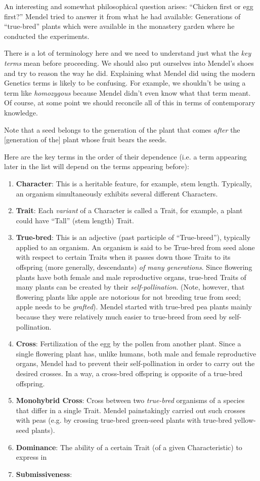 \documentclass[12pt]{article}
\begin{document}
An interesting and somewhat philosophical question arises: ``Chicken first or egg first?'' Mendel tried to answer it from what he had available: Generations of ``true-bred'' plants which were available in the monastery garden where he conducted the experiments. 

There is a lot of terminology here and we need to understand just what the \emph{key terms} mean before proceeding. We should also put ourselves into Mendel's shoes and try to reason the way he did. Explaining what Mendel did using the modern Genetics terms is likely to be confusing. For example, we shouldn't be using a term like \emph{homozygous} because Mendel didn't even know what that term meant. Of course, at some point we should reconcile all of this in terms of contemporary knowledge. 

Note that a seed belongs to the generation of the plant that comes \emph{after} the [generation of the] plant whose fruit bears the seeds.

Here are the key terms in the order of their dependence (i.e. a term appearing later in the list will depend on the terms appearing before):
\begin{enumerate}
    \item \textbf{Character}: This is a heritable feature, for example, stem length. Typically, an organism simultaneously exhibits several different Characters.
    \item \textbf{Trait}: Each \emph{variant} of a Character is called a Trait, for example, a plant could have ``Tall'' (stem length) Trait.
    \item \textbf{True-bred}: This is an adjective (past participle of ``True-breed''), typically applied to an organism. An organism is said to be True-bred from seed alone with respect to certain Traits when it passes down those Traits to its offspring (more generally, descendants) \emph{of many generations}. Since flowering plants have both female and male reproductive organs, true-bred Traits of many plants can be created by their \emph{self-pollination}. (Note, however, that flowering plants like apple are notorious for not breeding true from seed; apple needs to be \emph{grafted}). Mendel started with true-bred pea plants mainly because they were relatively much easier to true-breed from seed by self-pollination.
    \item \textbf{Cross}: Fertilization of the egg by the pollen from another plant. Since a single flowering plant has, unlike humans, both male and female reproductive organs, Mendel had to prevent their self-pollination in order to carry out the desired crosses. In a way, a cross-bred offspring is opposite of a true-bred offspring.
    \item \textbf{Monohybrid Cross}: Cross between two \emph{true-bred} organisms of a species that differ in a single Trait. Mendel painstakingly carried out such crosses with peas (e.g. by crossing true-bred green-seed plants with true-bred yellow-seed plants).
    \item \textbf{Dominance}: The ability of a certain Trait (of a given Characteristic) to express in 
    \item \textbf{Submissiveness}:
\end{enumerate}
\end{document}
